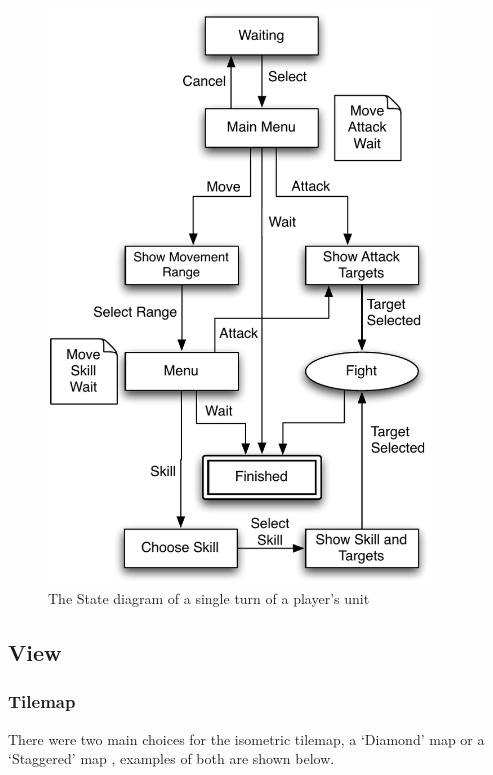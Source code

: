 \begin{figure}[hb]
	\centering
		\includegraphics[width=4in]{figures/unit.pdf}
	\caption{The State diagram of a single turn of a player's unit}
	\label{fig:figures_unit}
\end{figure}

\subsection{View}

\subsubsection{Tilemap}
\label{sub:tilemap}


There were two main choices for the isometric tilemap, a `Diamond' map or a  `Staggered' map \cite{isometric_game_programming}, examples of both are shown below.

